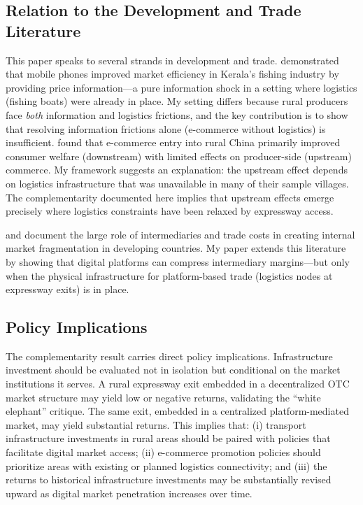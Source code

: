 \documentclass[12pt]{article}
\begin{document}
\subsection{Relation to the Development and Trade Literature}

This paper speaks to several strands in development and trade. \citet{jensen2007} demonstrated that mobile phones improved market efficiency in Kerala's fishing industry by providing price information---a pure information shock in a setting where logistics (fishing boats) were already in place. My setting differs because rural producers face \textit{both} information and logistics frictions, and the key contribution is to show that resolving information frictions alone (e-commerce without logistics) is insufficient. \citet{couture2021} found that e-commerce entry into rural China primarily improved consumer welfare (downstream) with limited effects on producer-side (upstream) commerce. My framework suggests an explanation: the upstream effect depends on logistics infrastructure that was unavailable in many of their sample villages. The complementarity documented here implies that upstream effects emerge precisely where logistics constraints have been relaxed by expressway access.

\citet{allen2014} and \citet{atkin2015} document the large role of intermediaries and trade costs in creating internal market fragmentation in developing countries. My paper extends this literature by showing that digital platforms can compress intermediary margins---but only when the physical infrastructure for platform-based trade (logistics nodes at expressway exits) is in place.

\subsection{Policy Implications}

The complementarity result carries direct policy implications. Infrastructure investment should be evaluated not in isolation but conditional on the market institutions it serves. A rural expressway exit embedded in a decentralized OTC market structure may yield low or negative returns, validating the ``white elephant'' critique. The same exit, embedded in a centralized platform-mediated market, may yield substantial returns. This implies that: (i) transport infrastructure investments in rural areas should be paired with policies that facilitate digital market access; (ii) e-commerce promotion policies should prioritize areas with existing or planned logistics connectivity; and (iii) the returns to historical infrastructure investments may be substantially revised upward as digital market penetration increases over time.
\end{document}
